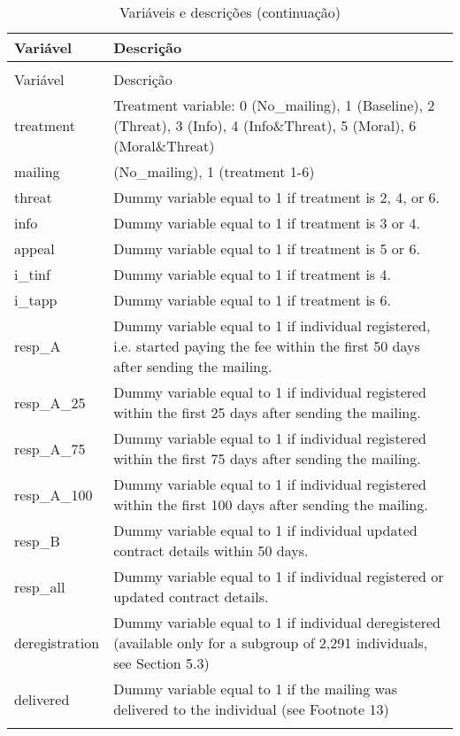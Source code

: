 
\begin{longtable}[t]{l>{\raggedright\arraybackslash}p{30em}}
\caption{\label{tab:descricao}Variáveis e descrições}\\
\toprule
Variável & Descrição\\
\midrule
\endfirsthead
\caption[]{Variáveis e descrições (continuação)}\\
\toprule
Variável & Descrição\\
\midrule
\endhead

\endfoot
\bottomrule
\endlastfoot
treatment & Treatment variable: 0 (No\_mailing), 1 (Baseline), 2 (Threat), 3 (Info), 4 (Info\&Threat), 5 (Moral), 6 (Moral\&Threat)\\
mailing & 0 (No\_mailing), 1 (treatment 1-6)\\
threat & Dummy variable equal to 1 if treatment is 2, 4, or 6.\\
info & Dummy variable equal to 1 if treatment is 3 or 4.\\
appeal & Dummy variable equal to 1 if treatment is 5 or 6.\\
\addlinespace
i\_tinf & Dummy variable equal to 1 if treatment is 4.\\
i\_tapp & Dummy variable equal to 1 if treatment is 6.\\
resp\_A & Dummy variable equal to 1 if individual registered, i.e. started paying the fee within the first 50 days after sending the mailing.\\
resp\_A\_25 & Dummy variable equal to 1 if individual registered within the first 25 days after sending the mailing.\\
resp\_A\_75 & Dummy variable equal to 1 if individual registered within the first 75 days after sending the mailing.\\
\addlinespace
resp\_A\_100 & Dummy variable equal to 1 if individual registered within the first 100 days after sending the mailing.\\
resp\_B & Dummy variable equal to 1 if individual updated contract details within 50 days.\\
resp\_all & Dummy variable equal to 1 if individual registered or updated contract details.\\
deregistration & Dummy variable equal to 1 if individual deregistered (available only for a subgroup of 2,291 individuals, see Section 5.3)\\
delivered & Dummy variable equal to 1 if the mailing was delivered to the individual (see Footnote 13)\\
\addlinespace

\end{longtable}
